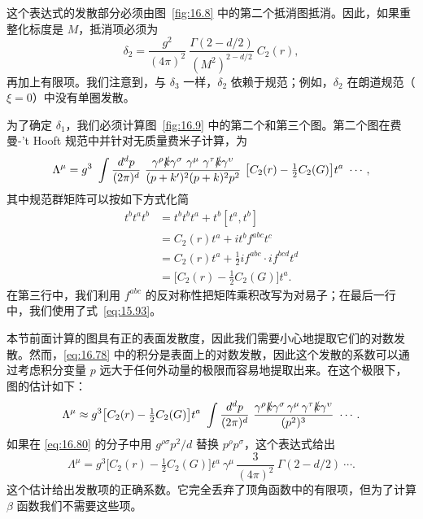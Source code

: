 这个表达式的发散部分必须由图~\ref{fig:16.8} 中的第二个抵消图抵消。因此，如果重整化标度是 $M$，抵消项必须为
\begin{equation}
  \delta_2 = \frac{g^2}{(4\pi)^2}\ \frac{\Gamma(2-d/2)}{(M^2)^{2-d/2}}\
    C_2(r) ,
  \label{eq:16.77}
\end{equation}
再加上有限项。我们注意到，与 $\delta_3$ 一样，$\delta_2$ 依赖于规范；例如，$\delta_2$ 在朗道规范（$\xi = 0$）中没有单圈发散。

为了确定 $\delta_1$，我们必须计算图~\ref{fig:16.9} 中的第二个和第三个图。第二个图在费曼-'t Hooft 规范中并针对无质量费米子计算，为
\begin{equation}
  \Lambda^\mu = g^3\ \int \frac{d^dp}{(2\pi)^d}\ \frac{
    \gamma^\rho\slashed{k}\gamma^\sigma\ \gamma^\mu\ \gamma^\tau
    \slashed{k}\gamma^\upsilon }{(p+k')^2(p+k)^2p^2}\ \bigl[ C_2(r)
    - \tfrac{1}{2}C_2(G) \bigr]t^a\ \cdots ,
  \label{eq:16.78}
\end{equation}
其中规范群矩阵可以按如下方式化简
\begin{equation}
  \begin{aligned}
    t^bt^at^b &= t^bt^bt^a + t^b[t^a, t^b]\\
    &= C_2(r)t^a + it^bf^{abc}t^c\\
    &= C_2(r)t^a + \frac{1}{2}if^{abc}\cdot if^{bcd}t^d\\
    &= \bigl[ C_2(r) - \frac{1}{2}C_2(G) \bigr]t^a .
  \end{aligned}
  \label{eq:16.79}
\end{equation}
在第三行中，我们利用 $f^{abc}$ 的反对称性把矩阵乘积改写为对易子；在最后一行中，我们使用了式~\eqref{eq:15.93}。

本节前面计算的图具有正的表面发散度，因此我们需要小心地提取它们的对数发散。然而，\eqref{eq:16.78} 中的积分是表面上的对数发散，因此这个发散的系数可以通过考虑积分变量 $p$ 远大于任何外动量的极限而容易地提取出来。在这个极限下，图的估计如下：
\begin{equation}
  \Lambda^\mu \approx g^3\bigl[ C_2(r) - \tfrac{1}{2}C_2(G) \bigr]t^a\ \int
    \frac{d^dp}{(2\pi)^d}\ \frac{\gamma^\rho\slashed{k}\gamma^\sigma\,
      \gamma^\mu\,\gamma^\tau\slashed{k}\gamma^\upsilon}{(p^2)^3}\ \cdots .
  \label{eq:16.80}
\end{equation}
如果在 \eqref{eq:16.80} 的分子中用 $g^{\rho\sigma}p^2/d$ 替换 $p^\rho p^\sigma$，这个表达式给出
\begin{equation}
  \Lambda^\mu = g^3\bigl[ C_2(r) - \tfrac{1}{2}C_2(G) \bigr]t^a\ \gamma^\mu\,
    \frac{3}{(4\pi)^2}\ \Gamma(2-d/2)\ \cdots .
  \label{eq:16.81}
\end{equation}
这个估计给出发散项的正确系数。它完全丢弃了顶角函数中的有限项，但为了计算 $\beta$ 函数我们不需要这些项。

